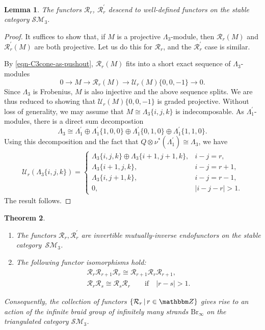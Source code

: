 \documentclass[pdftex]{sigma}
\newtheorem{thm}{Theorem}[section]
\newtheorem{lem}[thm]{Lemma}
\theoremstyle{definition}
\numberwithin{equation}{section}
\def\Z{{\mathbbm Z}}
\def\lra{{\longrightarrow}}
\def\mc{\mathcal}
\begin{document}
\begin{lem}The functors $\mc{R}_r$, $\mc{R}_r^\prime$ descend to well-defined functors on the stable category $\mc{SM}_3$.
\end{lem}
\begin{proof}It suffices to show that, if $M$ is a projective $\Lambda_3$-module, then $\mc{R}_r(M)$ and $\mc{R}^\prime_r(M)$ are both projective. Let us do this for $\mc{R}_r$, and the $\mc{R}^\prime_r$ case is similar.

By \eqref{eqn-C3cone-as-pushout}, $\mc{R}_r(M)$ fits into a short exact sequence of $\Lambda_3$-modules
\[
0\lra M \lra \mc{R}_r(M)\lra \mc{U}_r(M)\{0,0,-1\} \lra 0.
\]
Since $\Lambda_3$ is Frobenius, $M$ is also injective and the above sequence splits. We are thus reduced to showing that $\mc{U}_r(M)\{0,0,-1\}$ is graded projective. Without loss of generality, we may assume that $M\cong \Lambda_3\{i,j,k\}$ is indecomposable. As $\Lambda_1^\prime$-modules, there is a direct sum decompostion
\[
\Lambda_3\cong \Lambda_1^\prime\oplus \Lambda_1^\prime\{1,0,0\} \oplus \Lambda_1^\prime\{0,1,0\} \oplus \Lambda_1^\prime\{1,1,0\}.
\]
Using this decomposition and the fact that $Q\otimes \nu^*(\Lambda_1^\prime) \cong \Lambda_3$, we have
\begin{gather*}
\mc{U}_r(\Lambda_3\{i,j,k\})
=\begin{cases}
\Lambda_3\{i,j,k\} \oplus \Lambda_3\{i+1,j+1,k\}, & i-j=r,\\
\Lambda_3\{i+1,j,k\}, & i-j=r+1,\\
\Lambda_3\{i,j+1,k\}, & i-j=r-1,\\
0, & |i-j-r|>1.
\end{cases}
\end{gather*}
The result follows.
\end{proof}


\begin{thm} \label{thm-3-braid-group-actions}\quad
\begin{enumerate}\itemsep=0pt
\item [$(i)$]The functors $\mc{R}_r,\mc{R}^\prime_r$ are invertible mutually-inverse endofunctors on the stable catego\-ry~$\mc{SM}_3$.
\item[$(ii)$]The following functor isomorphisms hold:
\begin{subequations}
\begin{gather}
\label{rel-yb}
\mc{R}_r \mc{R}_{r+1} \mc{R}_r \cong \mc{R}_{r+1} \mc{R}_r \mc{R}_{r+1},\\
\label{rel-comm}
\mc{R}_r \mc{R}_s \cong \mc{R}_s \mc{R}_r\qquad \mathrm{if}\quad |r-s|>1.
\end{gather}
\end{subequations}
\end{enumerate}
Consequently, the collection of functors $\{\mc{R}_r\,|\,r\in \Z\}$ gives rise to an action of the infinite braid group of infinitely many strands $\mathrm{Br}_\infty$ on the triangulated category $\mc{SM}_3$.
\end{thm}
\end{document}
